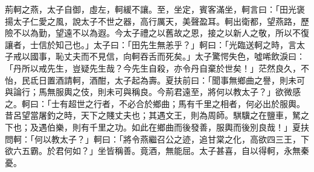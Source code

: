 \documentclass[12pt]{book}
\begin{document}
\begin{pairs}
\begin{Rightside}
\begin{chinese}
\beginnumbering
\pstart
荊軻之燕，太子自御，虛左，軻緩不讓。至，坐定，賓客滿坐，軻言曰：「田光褒揚太子仁愛之風，說太子不世之器，高行厲天，美聲盈耳。軻出衛都，望燕路，歷險不以為勤，望遠不以為遐。今太子禮之以舊故之恩，接之以新人之敬，所以不復讓者，士信於知己也。」太子曰：「田先生無恙乎？」軻曰：「光臨送軻之時，言太子戒以國事，恥丈夫而不見信，向軻吞舌而死矣。」太子驚愕失色，噓唏飲淚曰：「丹所以戒先生，豈疑先生哉？今先生自殺，亦令丹自棄於世矣！」茫然良久，不怡，民氐日置酒請軻，酒酣，太子起為壽。夏扶前曰：「聞事無鄉曲之譽，則未可與論行；馬無服輿之伎，則未可與稱良。今荊君遠至，將何以教太子？」欲微感之。軻曰：「士有超世之行者，不必合於鄉曲；馬有千里之相者，何必出於服輿。昔呂望當屠釣之時，天下之賤丈夫也；其遇文王，則為周師。騏驥之在鹽車，駑之下也；及遇伯樂，則有千里之功。如此在鄉曲而後發善，服輿而後別良哉！」夏扶問軻：「何以教太子？」軻曰：「將令燕繼召公之迹，追甘棠之化，高欲四三王，下欲六五霸。於君何如？」坐皆稱善。竟酒，無能屈。太子甚喜，自以得軻，永無秦憂。
\pend
\endnumbering
\end{chinese}
\end{Rightside}
\begin{Leftside}
\begin{fioesjfsoeifj}
\beginnumbering
\pstart

\end{fioesjfsoeifj}
\end{Leftside}
\end{pairs}
\end{document}
